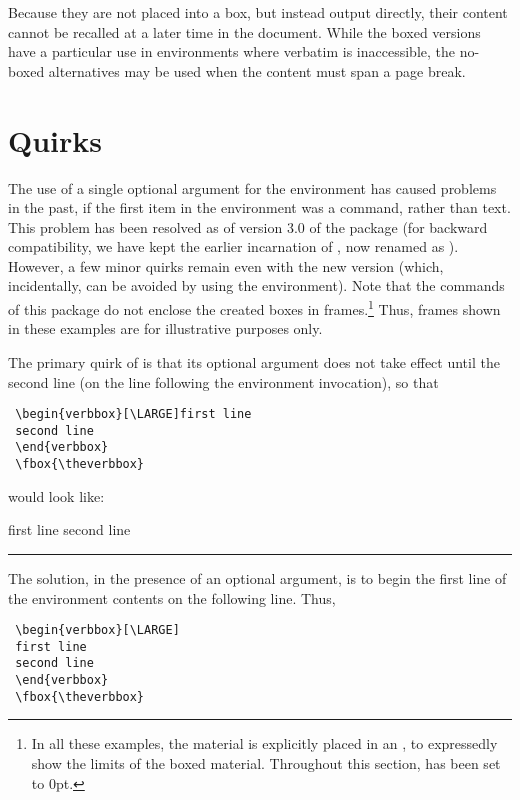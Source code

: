 \documentclass{article}
\newcommand\rl{\rule{1em}{0in}}
\begin{document}
\begin{myverbbox}{\myvb}
Because they are not placed into a box, but instead output directly,
their content cannot be recalled at a later time in the document.  While
the boxed versions have a particular use in environments where verbatim is
inaccessible, the no-boxed alternatives may be used when the content
must span a page break.

\section{Quirks}\fboxsep=0pt

The use of a single optional argument for the {\vrbox} environment has
caused problems in the past, if the first item in the environment was a
command, rather than text.  This problem has been resolved as of version
3.0 of the package (for backward compatibility, we have kept the earlier
incarnation of {\vrbox}, now renamed as \ovrbox).  However, a few minor
quirks remain even with the new version (which, incidentally, can be
avoided by using the {\myvrbox} environment).  Note that the commands of
this package do not enclose the created boxes in frames.\footnote{In all
these examples, the {\fsvrbox} material is explicitly placed in an \fbx,
to expressedly show the limits of the boxed material.  Throughout this
section, {\fbs} has been set to 0pt.} Thus, frames shown in these
examples are for illustrative purposes only.

The primary quirk of {\vrbox} is that its optional argument does not
take effect until the second line (on the line following the environment
invocation), so that

\begin{verbatim}
 \begin{verbbox}[\LARGE]first line
 second line
 \end{verbbox}
 \fbox{\theverbbox}
\end{verbatim}

would look like:\\
\begin{verbbox}[\LARGE]first line
second line
\end{verbbox}
\rl\addvbuffer[3pt 0pt]{\fbox{\theverbbox}}

The solution, in the presence of an optional argument, is to begin the
first line of the environment contents on the following line.  Thus,

\begin{verbatim}
 \begin{verbbox}[\LARGE]
 first line
 second line
 \end{verbbox}
 \fbox{\theverbbox}
\end{verbatim}


\end{myverbbox}
\end{document}

